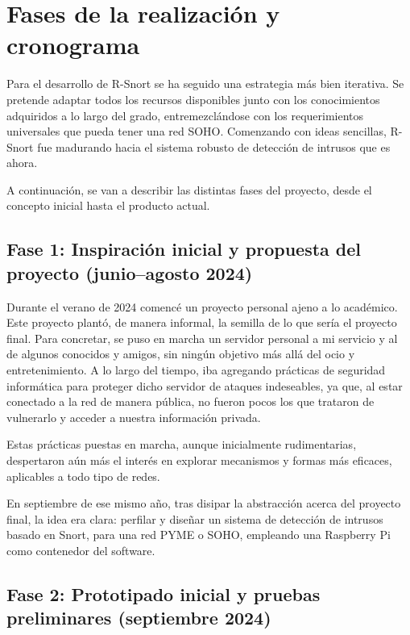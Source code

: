 \documentclass[11pt,a4paper,twoside]{report}
\begin{document}
\chapter{Fases de la realización y cronograma}

Para el desarrollo de R-Snort se ha seguido una estrategia más bien iterativa. Se pretende adaptar todos los recursos disponibles junto con los conocimientos adquiridos a lo largo del grado, entremezclándose con los requerimientos universales que pueda tener una red SOHO. Comenzando con ideas sencillas, R-Snort fue madurando hacia el sistema robusto de detección de intrusos que es ahora.\newline

A continuación, se van a describir las distintas fases del proyecto, desde el concepto inicial hasta el producto actual.

\section{Fase 1: Inspiración inicial y propuesta del proyecto (junio–agosto 2024)}

Durante el verano de 2024 comencé un proyecto personal ajeno a lo académico. Este proyecto plantó, de manera informal, la semilla de lo que sería el proyecto final. Para concretar, se puso en marcha un servidor personal a mi servicio y al de algunos conocidos y amigos, sin ningún objetivo más allá del ocio y entretenimiento. A lo largo del tiempo, iba agregando prácticas de seguridad informática para proteger dicho servidor de ataques indeseables, ya que, al estar conectado a la red de manera pública, no fueron pocos los que trataron de vulnerarlo y acceder a nuestra información privada.\newline

Estas prácticas puestas en marcha, aunque inicialmente rudimentarias, despertaron aún más el interés en explorar mecanismos y formas más eficaces, aplicables a todo tipo de redes.\newline

En septiembre de ese mismo año, tras disipar la abstracción acerca del proyecto final, la idea era clara: perfilar y diseñar un sistema de detección de intrusos basado en Snort, para una red PYME o SOHO, empleando una Raspberry Pi como contenedor del software.

\section{Fase 2: Prototipado inicial y pruebas preliminares (septiembre 2024)}
\end{document}
